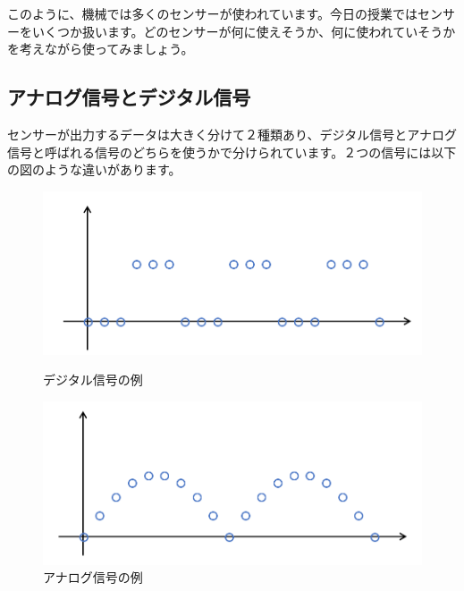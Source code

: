 このように、機械では多くのセンサーが使われています。今日の授業ではセンサーをいくつか扱います。どのセンサーが何に使えそうか、何に使われていそうかを考えながら使ってみましょう。

\begin{tcolorbox}[title=\useOmetoi]
\begin{enumerate}
\end{enumerate}
\end{tcolorbox}
\begin{tcolorbox}[title=\useOmetoi]
\begin{enumerate}
\end{enumerate}
\end{tcolorbox}

\subsection{アナログ信号とデジタル信号}
センサーが出力するデータは大きく分けて２種類あり、デジタル信号とアナログ信号と呼ばれる信号のどちらを使うかで分けられています。２つの信号には以下の図のような違いがあります。

\begin{figure}[htbp]
  \begin{minipage}[b]{0.45\linewidth}
    \centering
    \includegraphics[keepaspectratio, scale=0.4]{images/chap05/text05-img002.png}
    \caption{デジタル信号の例}
    \label{fig2}
  \end{minipage}
  \begin{minipage}[b]{0.45\linewidth}
    \centering
    \includegraphics[keepaspectratio, scale=0.4]{images/chap05/text05-img003.png}
    \caption{アナログ信号の例}
    \label{fig3}
  \end{minipage}
\end{figure}

